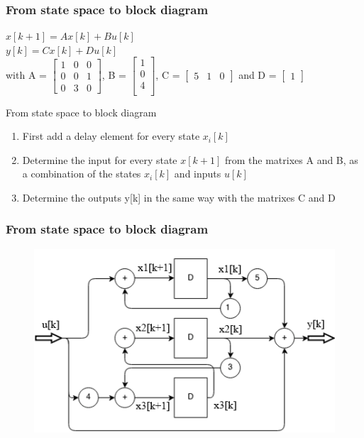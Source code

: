 \begin{frame}
	\frametitle{From state space to block diagram }
		\small{\begin{example}
				\begin{center}
					$x[k+1] = A x[k] + B u[k]$ \\
					$y[k] = C x[k] + D u[k] $ \\
					
					with  A = 
					$\begin{bmatrix}
					1 & 0 & 0 \\
					0 & 0 & 1 \\
					0 & 3 & 0
					\end{bmatrix}$,
					B = 
					$\begin{bmatrix}
					1\\
					0\\
					4\\
					\end{bmatrix}$,
					C = 
					$\begin{bmatrix}
					5 & 1 & 0
					\end{bmatrix}$ 
					and D = 
					$\begin{bmatrix}
					1
					\end{bmatrix}$ \\
				\end{center}
		\end{example} }
		
	\begin{block}{From state space to block diagram }
		\small{
		\begin{enumerate}
			\setlength\itemsep{-0.5em}
			\item First add a delay element for every state $x_i[k]$
			\item 	Determine the input for every state $x[k+1]$ from the matrixes A and B, as a combination of the states $x_i[k]$ and inputs $u[k]$
			\item Determine the outputs y[k] in the same way with the matrixes C and D
		\end{enumerate} }
	\end{block}
\end{frame}
\begin{frame}
	\frametitle{From state space to block diagram}
	\begin{figure}
		\centering
		\includegraphics[width=0.7\linewidth]{Images/discrete_time_systems_18}
		\label{fig:discrete_time_systems_18}
	\end{figure}

	
\end{frame}
